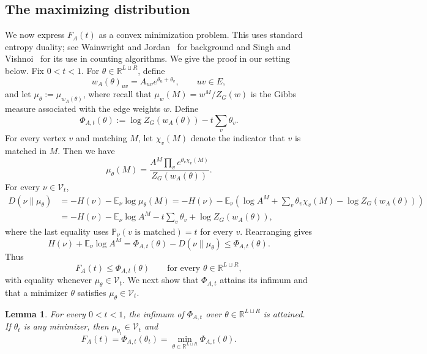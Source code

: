\documentclass[11pt,reqno,letterpaper]{amsart}
\numberwithin{equation}{section}
\newtheorem{lemma}[lemma]{Lemma}
\theoremstyle{definition}
\theoremstyle{remark}
\newcommand{\R}{\mathbb R}
\newcommand{\E}{\mathbb E}
\newcommand{\PP}{\mathbb P}
\begin{document}
\subsection{The maximizing distribution} We now express $F_A(t)$ as a convex minimization problem.
This uses standard entropy duality; see Wainwright and
Jordan~\cite{WainwrightJordan} for background and Singh and
Vishnoi~\cite{SinghVishnoi} for its use in counting algorithms.
We give the proof in our setting below.
Fix $0<t<1$. For $\theta\in\R^{L\sqcup R}$, define
\[
  w_A(\theta)_{uv}=A_{uv}e^{\theta_u+\theta_v},
  \qquad uv\in E,
\]
and let $\mu_\theta:=\mu_{w_A(\theta)}$, where recall that $\mu_w(M)=w^M/Z_G(w)$ is the Gibbs measure
associated with the edge weights $w$. 
Define
\begin{equation*}
  \Phi_{A,t}(\theta)
  :=\log Z_G(w_A(\theta))-t\sum_v\theta_v.
\end{equation*}
For every vertex $v$ and matching $M$, let $\chi_v(M)$ denote the indicator that $v$ is matched in $M$. Then we have
\[
\mu_\theta(M)=\frac{A^M\prod_v e^{\theta_v\chi_v(M)}}{Z_G(w_A(\theta))}.
\]
For every $\nu\in\mathcal V_t$,
\begin{align*}
  D(\nu\|\mu_\theta)
  &=
  -H(\nu)-\E_\nu\log\mu_\theta(M)=
  -H(\nu)-\E_\nu\left(\log A^M+\sum_v\theta_v\chi_v(M)-\log Z_G(w_A(\theta))\right)\\
  &=
  -H(\nu)-\E_\nu\log A^M
  -t\sum_v\theta_v
  +\log Z_G(w_A(\theta)),
\end{align*}
where the last equality uses
$\PP_\nu(v\text{ is matched})=t$ for every $v$. Rearranging gives
\begin{equation}\label{eq:gibbs-variational}
  H(\nu)+\E_\nu\log A^M
  =
  \Phi_{A,t}(\theta)-D(\nu\|\mu_\theta)
  \leq
  \Phi_{A,t}(\theta).
\end{equation}
Thus
\[
  F_A(t)\leq\Phi_{A,t}(\theta)
  \qquad\text{for every }\theta\in\R^{L\sqcup R},
\]
with equality whenever $\mu_\theta\in\mathcal V_t$. We next show that $\Phi_{A,t}$ attains its infimum and that a
minimizer $\theta$ satisfies $\mu_\theta\in\mathcal V_t$.
\begin{lemma}\label{lem:balanced-gibbs}
For every $0<t<1$, the infimum of $\Phi_{A,t}$ over
$\theta\in \R^{L\sqcup R}$ is attained. If $\theta_t$ is any minimizer, then
$\mu_{\theta_t}\in\mathcal V_t$ and
\begin{equation}\label{eq:balanced-dual}
  F_A(t)
  =
  \Phi_{A,t}(\theta_t)
  =
  \min_{\theta\in\R^{L\sqcup R}}\Phi_{A,t}(\theta).
\end{equation}
\end{lemma}
\end{document}
